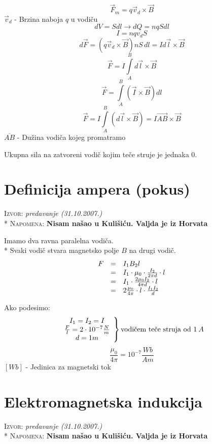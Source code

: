 \documentclass{report}
\begin{document}
$$\vec{F}_m = q \vec{v}_d \times \vec{B}$$
$\vec{v}_d$ - Brzina naboja $q$ u vodiču
$$dV = Sdl \to dQ = nqSdl$$
$$I = nqv_dS$$
$$d\vec{F} = (q \vec{v}_d \times \vec{B}) n S \, dl = Id \vec{l} \times \vec{B}$$
$$\vec{F} = I \int \limits_A^B {d\vec{l} \times \vec{B}}$$
$$\vec{F} = \int \limits_A^B {(\vec{I} \times \vec{B})dl}$$
$$\vec{F} = I \int \limits_A^B {(d\vec{l} \times \vec{B})} = I \overrightarrow {AB} \times \vec{B}$$
$\overline {AB} $ - Dužina vodiča kojeg promatramo

Ukupna sila na zatvoreni vodič kojim teče struje je jednaka $0$.

\section{Definicija ampera (pokus)}
\small \textsc{Izvor:} \textit{predavanje (31.10.2007.)}\\*
\small \textsc{Napomena:} \textbf{Nisam našao u Kulišiću. Valjda je iz Horvata}

Imamo dva ravna paralelna vodiča.\\*
Svaki vodič stvara magnetsko polje $B$ na drugi vodič.
$$\begin{array}{*{20}c}
   {F} \hfill & {=} \hfill & {I_1 B_2 l} \hfill  \\
   {} \hfill & {=} \hfill & {I_1 \cdot \mu_0 \cdot \frac{I _2}{2 \pi d} \cdot l} \hfill  \\
   {} \hfill & {=} \hfill & {I_1 \cdot \frac{2 \mu _0 I_2}{4 \pi d} \cdot l} \hfill  \\
	 {} \hfill & {=} \hfill & {2 \frac{\mu _0}{4 \pi} \cdot l \cdot \frac{I_1 I_2}{d}} \hfill  \\
 \end{array} $$
 
Ako podesimo:
$$\left. {\begin{array}{*{20}c}
   {I_1 = I_2 = I}  \\
   {\frac{F}{l} = 2 \cdot 10^{-7} \frac{N}{m}}  \\
   {d = 1 m}  \\

 \end{array} } \right\}{\text{vodičem teče struja od } 1\:A}$$
$$\frac{\mu _0}{4 \pi} = 10^{-7} \frac{Wb}{Am}$$
$[Wb]$ - Jedinica za magnetski tok

\section{Elektromagnetska indukcija}
\small \textsc{Izvor:} \textit{predavanje (31.10.2007.)}\\*
\small \textsc{Napomena:} \textbf{Nisam našao u Kulišiću. Valjda je iz Horvata}
\end{document}
